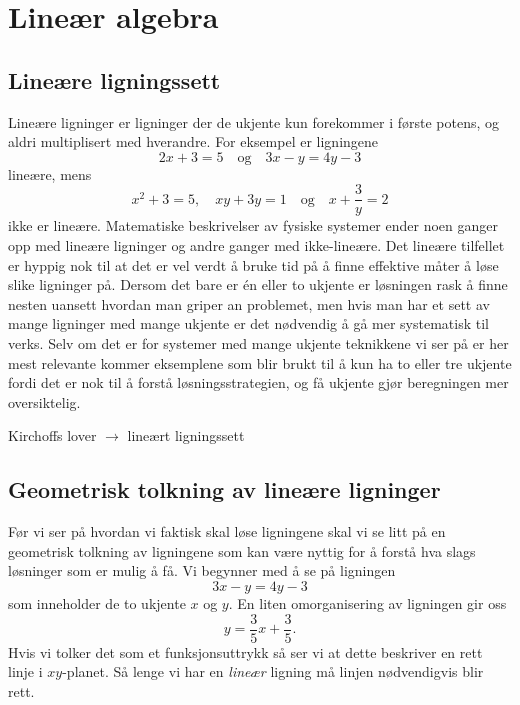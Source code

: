\documentclass[a4paper,norsk,12pt]{article}
\newcounter{exa}
\begin{document}
\section{Lineær algebra}

\subsection{Lineære ligningssett}
Lineære ligninger er ligninger der de ukjente kun forekommer i første potens, og aldri multiplisert med hverandre. For eksempel er ligningene
\begin{displaymath}
	2x + 3 = 5 \quad \text{og}\quad 3 x - y = 4y - 3
\end{displaymath}
lineære, mens
\begin{displaymath}
	x^2 + 3 = 5, \quad xy + 3y = 1 \quad \text{og}\quad x + \frac{3}{y} = 2
\end{displaymath}
ikke er lineære. Matematiske beskrivelser av fysiske systemer ender noen ganger opp med lineære ligninger og andre ganger med ikke-lineære. Det lineære tilfellet er hyppig nok til at det er vel verdt å bruke tid på å finne effektive måter å løse slike ligninger på. Dersom det bare er \'en eller to ukjente er løsningen rask å finne nesten uansett hvordan man griper an problemet, men hvis man har et sett av mange ligninger med mange ukjente er det nødvendig å gå mer systematisk til verks. Selv om det er for systemer med mange ukjente teknikkene vi ser på er her mest relevante kommer eksemplene som blir brukt til å kun ha to eller tre ukjente fordi det er nok til å forstå løsningsstrategien, og få ukjente gjør beregningen mer oversiktelig.

\begin{texample}
Kirchoffs lover $\to$ lineært ligningssett
\end{texample}

\subsection{Geometrisk tolkning av lineære ligninger}
Før vi ser på hvordan vi faktisk skal løse ligningene skal vi se litt på en geometrisk tolkning av ligningene som kan være nyttig for å forstå hva slags løsninger som er mulig å få. Vi begynner med å se på ligningen
\begin{displaymath}
	3x-y = 4y -3
\end{displaymath}
som inneholder de to ukjente $x$ og $y$. En liten omorganisering av ligningen gir oss
\begin{displaymath}
	y = \frac35x + \frac35.
\end{displaymath}
Hvis vi tolker det som et funksjonsuttrykk så ser vi at dette beskriver en rett linje i $xy$-planet. Så lenge vi har en \emph{lineær} ligning må linjen nødvendigvis blir rett. 
\end{document}
